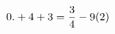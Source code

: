 \documentclass[preview]{standalone}
\begin{document}
\begin{align*}
\special{dvisvgm:raw <g id='unique000'>}0.+ 4 + 3 = \frac{3}{4} - 9(2)\special{dvisvgm:raw </g>}
\end{align*}
\end{document}

